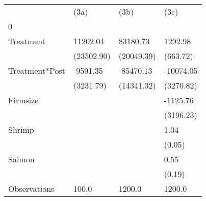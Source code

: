 \begin{tabular}{llll}
\toprule
{} &        (3a) &        (3b) &       (3c) \\
0              &             &             &            \\
\midrule
Treatment      &    11202.04 &    83180.73 &    1292.98 \\
               &  (23502.90) &  (20049.39) &   (663.72) \\
Treatment*Post &    -9591.35 &   -85470.13 &  -10074.05 \\
               &   (3231.79) &  (14341.32) &  (3270.82) \\
Firmsize       &             &             &   -1125.76 \\
               &             &             &  (3196.23) \\
Shrimp         &             &             &       1.04 \\
               &             &             &     (0.05) \\
Salmon         &             &             &       0.55 \\
               &             &             &     (0.19) \\
Observations   &       100.0 &      1200.0 &     1200.0 \\
\bottomrule
\end{tabular}
